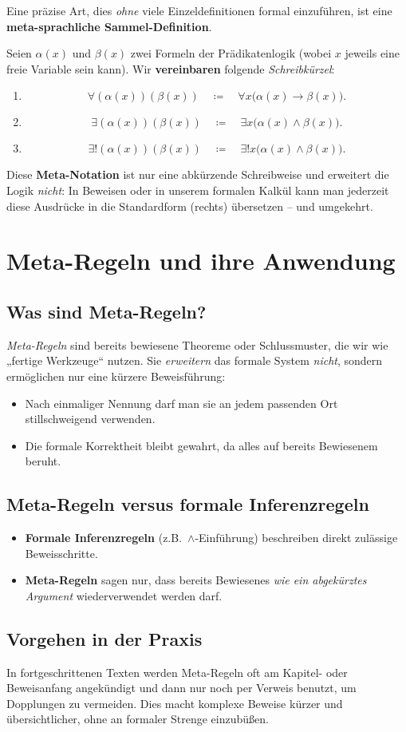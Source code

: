 \documentclass[main.tex]{subfiles}
\begin{document}
Eine präzise Art, dies \emph{ohne} viele Einzeldefinitionen formal einzuführen, ist eine \textbf{meta-sprachliche Sammel-Definition}. 

\begin{definition}
Seien $\alpha(x)$ und $\beta(x)$ zwei Formeln der Prädikatenlogik (wobei $x$ jeweils eine freie Variable sein kann). Wir \textbf{vereinbaren} folgende \emph{Schreibkürzel}:

\begin{enumerate}
  \item \[
    \forall(\alpha(x))(\beta(x))
    \quad\coloneqq\quad
    \forall x\bigl(\alpha(x)\to\beta(x)\bigr).
  \]
  \item \[
    \exists (\alpha(x))(\beta(x))
    \quad\coloneqq\quad
    \exists x\bigl(\alpha(x)\land\beta(x)\bigr).
  \]
    \item \[
    \exists! (\alpha(x))(\beta(x))
    \quad\coloneqq\quad
    \exists! x\bigl(\alpha(x)\land\beta(x)\bigr).
  \]
\end{enumerate}
%
Diese \textbf{Meta-Notation} ist nur eine abkürzende Schreibweise und erweitert die Logik \emph{nicht}: In Beweisen oder in unserem formalen Kalkül kann man jederzeit diese Ausdrücke in die Standardform (rechts) übersetzen – und umgekehrt.
\end{definition}

\section{Meta-Regeln und ihre Anwendung}
\subsection{Was sind Meta-Regeln?}
\emph{Meta-Regeln} sind bereits bewiesene Theoreme oder Schlussmuster, die wir wie „fertige Werkzeuge“ nutzen. Sie \emph{erweitern} das formale System \emph{nicht}, sondern ermöglichen nur eine kürzere Beweisführung: 
\begin{itemize}
\item Nach einmaliger Nennung darf man sie an jedem passenden Ort stillschweigend verwenden.  
\item Die formale Korrektheit bleibt gewahrt, da alles auf bereits Bewiesenem beruht.
\end{itemize}

\subsection{Meta-Regeln versus formale Inferenzregeln}
\label{sec:metaRegelnVsInferenzregeln}
\begin{itemize}
\item \textbf{Formale Inferenzregeln} (z.B.\ $\land$-Einführung) beschreiben direkt zulässige Beweisschritte.
\item \textbf{Meta-Regeln} sagen nur, dass bereits Bewiesenes \emph{wie ein abgekürztes Argument} wiederverwendet werden darf.  
\end{itemize}

\subsection{Vorgehen in der Praxis}
In fortgeschrittenen Texten werden Meta-Regeln oft am Kapitel- oder Beweisanfang angekündigt und dann nur noch per Verweis benutzt, um Dopplungen zu vermeiden. Dies macht komplexe Beweise kürzer und übersichtlicher, ohne an formaler Strenge einzubüßen.
\end{document}
